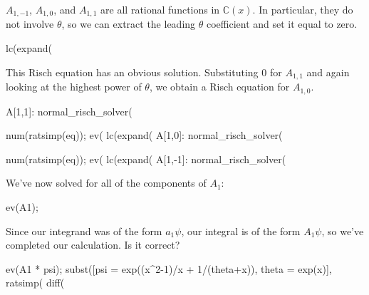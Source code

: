 $A_{1,-1}$, $A_{1,0}$, and $A_{1,1}$ are all rational functions in
${\mathbb C}(x)$.  In particular, they do not involve $\theta$, so we
can extract the leading $\theta$ coefficient and set it equal to zero.

\begin{maximablock}
lc(expand(%
\end{maximablock}

This Risch equation has an obvious solution.  Substituting $0$
for $A_{1,1}$ and again looking at the highest power
of $\theta$, we obtain a Risch equation for $A_{1,0}$.

\begin{maximablock}
A[1,1]: normal_risch_solver(%

num(ratsimp(eq));
ev(%
lc(expand(%
A[1,0]: normal_risch_solver(%

num(ratsimp(eq));
ev(%
lc(expand(%
A[1,-1]: normal_risch_solver(%
\end{maximablock}

We've now solved for all of the components of $A_1$:

\begin{maximablock}
ev(A1);
\end{maximablock}

Since our integrand was of the form $a_1 \psi$, our integral is of the
form $A_1 \psi$, so we've completed our calculation.  Is it correct?

\begin{maximablock}
ev(A1 * psi);
subst([psi = exp((x^2-1)/x + 1/(theta+x)),
       theta = exp(x)],
ratsimp(%
diff(%
\end{maximablock}


\endexample


